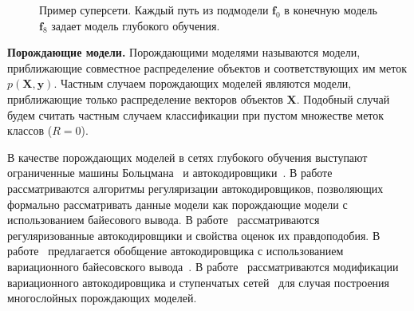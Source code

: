 \begin{figure}
\centering
{}
\caption{Пример суперсети. Каждый путь из подмодели $\mathbf{f}_0$ в конечную модель $\mathbf{f}_8$ задает модель глубокого обучения.}
\label{fig:supernet}

\end{figure}

\textbf{Порождающие модели. }
Порождающими моделями называются модели, приближающие совместное распределение объектов и соответствующих им меток $p(\mathbf{X}, \mathbf{y})$. Частным случаем порождающих моделей являются модели, приближающие только распределение векторов объектов $\mathbf{X}$. Подобный случай будем считать частным случаем классификации при пустом множестве меток классов ($R=0$).

В качестве порождающих моделей в сетях глубокого обучения выступают ограниченные машины Больцмана~\cite{hinton_rbm} и автокодировщики~\cite{founds}. В работе~\cite{contractive} рассматриваются алгоритмы регуляризации автокодировщиков, позволяющих формально рассматривать данные модели как порождающие модели с использованием байесового вывода. В работе~\cite{score} рассматриваются регуляризованные автокодировщики и свойства оценок их правдоподобия. В работе~\cite{vae} предлагается обобщение автокодировщика с использованием вариационного байесовского вывода~\cite{bishop}. В работе~\cite{train_generative} рассматриваются модификации вариационного автокодировщика и ступенчатых сетей~\cite{ladder} для случая построения многослойных порождающих моделей. 



